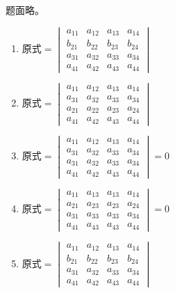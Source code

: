 \begin{problem}[课后习题 8]
	题面略。

	\begin{solution}
		\begin{enumerate}
			\item $\displaystyle\text{原式} = \begin{vmatrix}
				a_{11} & a_{12} & a_{13} & a_{14} \\
				b_{21} & b_{22} & b_{23} & b_{24} \\
				a_{31} & a_{32} & a_{33} & a_{34} \\
				a_{41} & a_{42} & a_{43} & a_{44}
			\end{vmatrix}$
			\item $\displaystyle\text{原式} = \begin{vmatrix}
				a_{11} & a_{12} & a_{13} & a_{14} \\
				a_{31} & a_{32} & a_{33} & a_{34} \\
				a_{21} & a_{22} & a_{23} & a_{24} \\
				a_{41} & a_{42} & a_{43} & a_{44}
			\end{vmatrix}$
			\item $\displaystyle\text{原式} = \begin{vmatrix}
				a_{11} & a_{12} & a_{13} & a_{14} \\
				a_{31} & a_{32} & a_{33} & a_{34} \\
				a_{31} & a_{32} & a_{33} & a_{34} \\
				a_{41} & a_{42} & a_{43} & a_{44}
			\end{vmatrix} = 0$
			\item $\displaystyle\text{原式} = \begin{vmatrix}
				a_{11} & a_{13} & a_{13} & a_{14} \\
				a_{21} & a_{23} & a_{23} & a_{24} \\
				a_{31} & a_{33} & a_{33} & a_{34} \\
				a_{41} & a_{43} & a_{43} & a_{44}
			\end{vmatrix} = 0$
			\item $\displaystyle\text{原式} = \begin{vmatrix}
				a_{11} & a_{12} & a_{13} & a_{14} \\
				b_{21} & b_{22} & b_{23} & b_{24} \\
				a_{31} & a_{32} & a_{33} & a_{34} \\
				a_{41} & a_{42} & a_{43} & a_{44}
			\end{vmatrix}$
		\end{enumerate}
	\end{solution}
\end{problem}

